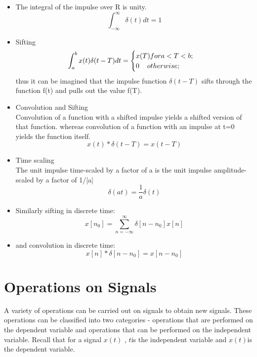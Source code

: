 \documentclass[a4paper,12pt]{book}
\begin{document}
\begin{itemize}
\item The integral of the impulse over R is unity.
$$\int_{-\infty}^{\infty}\delta (t)dt = 1$$
\item Sifting\\
$$\int_{a}^{b}x(t)\delta(t-T)dt=\begin{cases}
x(T) for a<T<b;\\
0\hspace{4mm} otherwise;\\
\end{cases} $$
thus it can be imagined that the impulse function $\delta(t-T)$ sifts through the function f(t) and pulls out the value f(T).\\
\item Convolution and Sifting\\
Convolution of a function with a shifted impulse yields a shifted version of that function. whereas convolution of a function with an impulse at t=0 yields the function itself.
$$x(t) \ast \delta(t-T) = x(t-T)$$
\item Time scaling\\
The unit impulse time-scaled by a factor of a is the unit impulse amplitude-scaled by a factor of 1/|a|\\
$$\delta(at)=\frac{1}{a}\delta(t)$$
\item Similarly sifting in discrete time:\\
$$x[n_0] = \sum_{n = -\infty}^\infty \delta[n - n_0] x[n]$$
\item and convolution in discrete time:\\
$$x[n] \ast \delta[n-n_0] = x[n-n_0]  $$
\end{itemize}




\section{Operations on Signals}
A variety of operations can be carried out on signals to obtain new signals. These operations can be classified into two categories - operations that are performed on the dependent variable and operations that can be performed on the independent variable. Recall that for a signal $x(t)$ , $t$is the independent variable and $x(t)$is the dependent variable.
\end{document}
